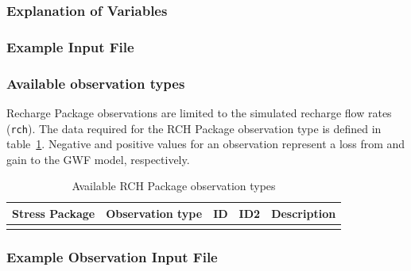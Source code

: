 \vspace{5mm}
\subsubsection{Explanation of Variables}
\begin{description}

\end{description}

\vspace{5mm}
\subsubsection{Example Input File}


\vspace{5mm}
\subsubsection{Available observation types}
Recharge Package observations are limited to the simulated recharge flow rates (\texttt{rch}). The data required for the RCH Package observation type is defined in table~\ref{table:gwf-rchobstype}. Negative and positive values for an observation represent a loss from and gain to the GWF model, respectively.

\begin{longtable}{p{2cm} p{2.75cm} p{2cm} p{1.25cm} p{7cm}}
\caption{Available RCH Package observation types} \tabularnewline

\hline
\hline
\textbf{Stress Package} & \textbf{Observation type} & \textbf{ID} & \textbf{ID2} & \textbf{Description} \\
\hline
\endhead

\hline
\endfoot


\label{table:gwf-rchobstype}
\end{longtable}

\vspace{5mm}
\subsubsection{Example Observation Input File}

